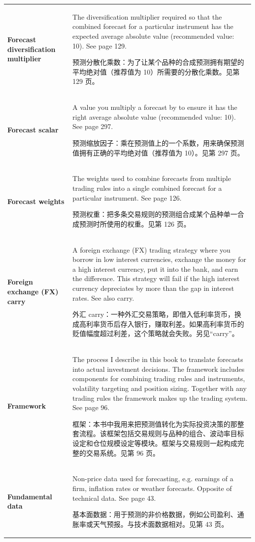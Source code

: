 \begin{chinesetableblock}
{\begin{longtable}{@{}>{\raggedright\arraybackslash\bfseries} p{}>{\raggedright\arraybackslash} p{}@{}}
Forecast diversification multiplier & The diversification multiplier required so that the combined forecast for a particular instrument has the expected average absolute value (recommended value: 10). See page 129. \par 预测分散化乘数：为了让某个品种的合成预测拥有期望的平均绝对值（推荐值为 10）所需要的分散化乘数。见第 129 页。 \\[0.65em]
Forecast scalar & A value you multiply a forecast by to ensure it has the right average absolute value (recommended value: 10). See page 297. \par 预测缩放因子：乘在预测值上的一个系数，用来确保预测值拥有正确的平均绝对值（推荐值为 10）。见第 297 页。 \\[0.65em]
Forecast weights & The weights used to combine forecasts from multiple trading rules into a single combined forecast for a particular instrument. See page 126. \par 预测权重：把多条交易规则的预测组合成某个品种单一合成预测时所使用的权重。见第 126 页。 \\[0.65em]
Foreign exchange (FX) carry & A foreign exchange (FX) trading strategy where you borrow in low interest currencies, exchange the money for a high interest currency, put it into the bank, and earn the difference. This strategy will fail if the high interest currency depreciates by more than the gap in interest rates. See also carry. \par 外汇 carry：一种外汇交易策略，即借入低利率货币，换成高利率货币后存入银行，赚取利差。如果高利率货币的贬值幅度超过利差，这个策略就会失败。另见“carry”。 \\[0.65em]
Framework & The process I describe in this book to translate forecasts into actual investment decisions. The framework includes components for combining trading rules and instruments, volatility targeting and position sizing. Together with any trading rules the framework makes up the trading system. See page 96. \par 框架：本书中我用来把预测值转化为实际投资决策的那整套流程。该框架包括交易规则与品种的组合、波动率目标设定和仓位规模设定等模块。框架与交易规则一起构成完整的交易系统。见第 96 页。 \\[0.65em]
Fundamental data & Non-price data used for forecasting, e.g. earnings of a firm, inflation rates or weather forecasts. Opposite of technical data. See page 43. \par 基本面数据：用于预测的非价格数据，例如公司盈利、通胀率或天气预报。与技术面数据相对。见第 43 页。 \\[0.65em]

\end{longtable}}
\end{chinesetableblock}
